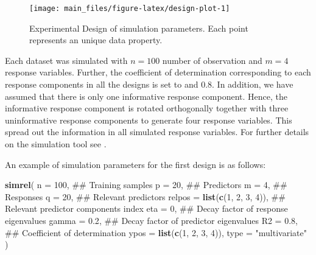 \documentclass[12pt,3p,authoryear]{elsarticle}
\newenvironment{Shaded}{\begin{snugshade}}{\end{snugshade}}
\newcommand{\KeywordTok}[1]{\textcolor[rgb]{0.13,0.29,0.53}{\textbf{#1}}}
\newcommand{\DataTypeTok}[1]{\textcolor[rgb]{0.13,0.29,0.53}{#1}}
\newcommand{\DecValTok}[1]{\textcolor[rgb]{0.00,0.00,0.81}{#1}}
\newcommand{\FloatTok}[1]{\textcolor[rgb]{0.00,0.00,0.81}{#1}}
\newcommand{\StringTok}[1]{\textcolor[rgb]{0.31,0.60,0.02}{#1}}
\newcommand{\NormalTok}[1]{#1}
\providecommand{\tightlist}{%
  \setlength{\itemsep}{0pt}\setlength{\parskip}{0pt}}
\begin{document}
\begin{figure}
\texttt{[image: main\_files/figure-latex/design-plot-1]} \caption{Experimental Design of simulation parameters. Each point represents an unique data property.}\label{fig:design-plot}
\end{figure}

\begin{description}
\tightlist
\item[\textbf{Common parameters:}]
Each dataset was simulated with \(n = 100\) number of observation and
\(m = 4\) response variables. Further, the coefficient of determination
corresponding to each response components in all the designs is set to
and 0.8. In addition, we have assumed that there is only one informative
response component. Hence, the informative response component is rotated
orthogonally together with three uninformative response components to
generate four response variables. This spread out the information in all
simulated response variables. For further details on the simulation tool
see \citep{Rimal2018}.
\end{description}

An example of simulation parameters for the first design is as follows:

\begin{Shaded}
\begin{Highlighting}[]
\KeywordTok{simrel}\NormalTok{(}
    \DataTypeTok{n       =} \DecValTok{100}\NormalTok{,                 ## Training samples}
    \DataTypeTok{p       =} \DecValTok{20}\NormalTok{,                  ## Predictors}
    \DataTypeTok{m       =} \DecValTok{4}\NormalTok{,                   ## Responses}
    \DataTypeTok{q       =} \DecValTok{20}\NormalTok{,                  ## Relevant predictors}
    \DataTypeTok{relpos  =} \KeywordTok{list}\NormalTok{(}\KeywordTok{c}\NormalTok{(}\DecValTok{1}\NormalTok{, }\DecValTok{2}\NormalTok{, }\DecValTok{3}\NormalTok{, }\DecValTok{4}\NormalTok{)), ## Relevant predictor components index}
    \DataTypeTok{eta     =} \DecValTok{0}\NormalTok{,                   ## Decay factor of response eigenvalues}
    \DataTypeTok{gamma   =} \FloatTok{0.2}\NormalTok{,                 ## Decay factor of predictor eigenvalues}
    \DataTypeTok{R2      =} \FloatTok{0.8}\NormalTok{,                 ## Coefficient of determination}
    \DataTypeTok{ypos    =} \KeywordTok{list}\NormalTok{(}\KeywordTok{c}\NormalTok{(}\DecValTok{1}\NormalTok{, }\DecValTok{2}\NormalTok{, }\DecValTok{3}\NormalTok{, }\DecValTok{4}\NormalTok{)),}
    \DataTypeTok{type    =} \StringTok{"multivariate"}
\NormalTok{)}
\end{Highlighting}
\end{Shaded}
\end{document}

